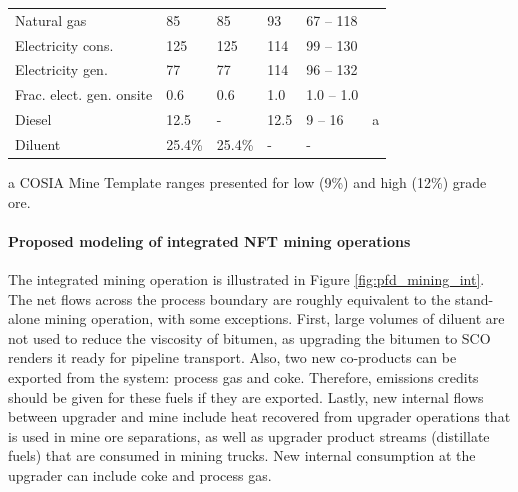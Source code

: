 \documentclass[11pt]{report}
\begin{document}
\begin{table}
\begin{scriptsize}
\tablelasttail{\bottomrule}
\label{tab:mining_nonint_energy}
\begin{threeparttable}
\begin{supertabular*}{1\columnwidth}{p{0.2\columnwidth}p{0.1\columnwidth}p{0.1\columnwidth}p{0.1\columnwidth}p{0.1\columnwidth} p{0.1\columnwidth}}
		
Natural gas		& 85		& 85		& 93		& 67 -- 118 		& \\
Electricity	cons.	& 125	& 125	& 114	& 99 -- 130		& \\
Electricity gen.		& 77		& 77		& 114	& 96 -- 132		& \\
Frac. elect. gen. onsite	& 0.6 	& 0.6		& 1.0		& 1.0 -- 1.0	& \\
Diesel			& 12.5	& -		& 12.5	& 9 -- 16			& a \\	
Diluent			& 25.4\%	& 25.4\%	& -		& -				& \\
\end{supertabular*}
\begin{tablenotes}
\item[a] COSIA Mine Template ranges presented for low (9\%) and high (12\%) grade ore.
\end{tablenotes}
\end{threeparttable}
\end{scriptsize}
\end{table}



\paragraph{Proposed modeling of integrated NFT mining operations}


The integrated mining operation is illustrated in Figure \ref{fig:pfd_mining_int}.  The net flows across the process boundary are roughly equivalent to the stand-alone mining operation, with some exceptions. First, large volumes of diluent are not used to reduce the viscosity of bitumen, as upgrading the bitumen to SCO renders it ready for pipeline transport.  Also, two new co-products can be exported from the system: process gas and coke.  Therefore, emissions credits should be given for these fuels if they are exported.  Lastly, new internal flows between upgrader and mine include heat recovered from upgrader operations that is used in mine ore separations, as well as upgrader product streams (distillate fuels) that are consumed in mining trucks.  New internal consumption at the upgrader can include coke and process gas.
\end{document}
